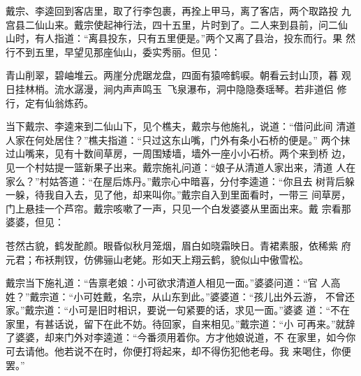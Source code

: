 戴宗、李逵回到客店里，取了行李包裹，再拴上甲马，离了客店，两个取路投
九宫县二仙山来。戴宗使起神行法，四十五里，片时到了。二人来到县前，问二仙
山时，有人指道：“离县投东，只有五里便是。”两个又离了县治，投东而行。果
然行不到五里，早望见那座仙山，委实秀丽。但见：

青山削翠，碧岫堆云。两崖分虎踞龙盘，四面有猿啼鹤唳。朝看云封山顶，暮
观日挂林梢。流水潺漫，涧内声声鸣玉；飞泉瀑布，洞中隐隐奏瑶琴。若非道侣
修行，定有仙翁炼药。

当下戴宗、李逵来到二仙山下，见个樵夫，戴宗与他施礼，说道：“借问此间
清道人家在何处居住？”樵夫指道：“只过这东山嘴，门外有条小石桥的便是。”
两个抹过山嘴来，见有十数间草房，一周围矮墙，墙外一座小小石桥。两个来到桥
边，见一个村姑提一篮新果子出来。戴宗施礼问道：“娘子从清道人家出来，清道
人在家么？”村姑答道：“在屋后炼丹。”戴宗心中暗喜，分付李逵道：“你且去
树背后躲一躲，待我自入去，见了他，却来叫你。”戴宗自入到里面看时，一带三
间草房，门上悬挂一个芦帘。戴宗咳嗽了一声，只见一个白发婆婆从里面出来。戴
宗看那婆婆，但见：

苍然古貌，鹤发酡颜。眼昏似秋月笼烟，眉白如晓霜映日。青裙素服，依稀紫
府元君；布袄荆钗，仿佛骊山老姥。形如天上翔云鹤，貌似山中傲雪松。

戴宗当下施礼道：“告禀老娘：小可欲求清道人相见一面。”婆婆问道：“官
人高姓？”戴宗道：“小可姓戴，名宗，从山东到此。”婆婆道：“孩儿出外云游，
不曾还家。”戴宗道：“小可是旧时相识，要说一句紧要的话，求见一面。”婆婆
道：“不在家里，有甚话说，留下在此不妨。待回家，自来相见。”戴宗道：“小
可再来。”就辞了婆婆，却来门外对李逵道：“今番须用着你。方才他娘说道，不
在家里，如今你可去请他。他若说不在时，你便打将起来，却不得伤犯他老母。我
来喝住，你便罢。”

